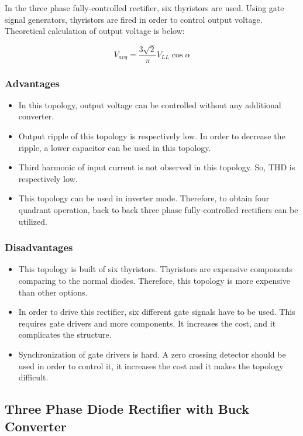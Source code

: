 In the three phase fully-controlled rectifier, six thyristors are used. Using gate signal generators, thyristors are fired in order to control output voltage. Theoretical calculation of output voltage is below:

\begin{equation}
    V_{avg} = \frac{3 \sqrt{2}}{\pi} V_{LL} \cos{\alpha} 
\end{equation}

\subsubsection{Advantages}
\begin{itemize}
    \item In this topology, output voltage can be controlled without any additional converter.
    \item Output ripple of this topology is respectively low. In order to decrease the ripple, a lower capacitor can be used in this topology.
    \item Third harmonic of input current is not observed in this topology. So, THD is respectively low.
    \item This topology can be used in inverter mode. Therefore, to obtain four quadrant operation, back to back three phase fully-controlled rectifiers can be utilized.
\end{itemize}

\subsubsection{Disadvantages}
\begin{itemize}
    \item This topology is built of six thyristors. Thyristors are expensive components comparing to the normal diodes. Therefore, this topology is more expensive than other options.
    \item In order to drive this rectifier, six different gate signals have to be used. This requires gate drivers and more components. It increases the cost, and it complicates the structure.
    \item Synchronization of gate drivers is hard. A zero crossing detector should be used in order to control it, it increases the cost and it makes the topology difficult.
\end{itemize}

\subsection{Three Phase Diode Rectifier with Buck Converter}
